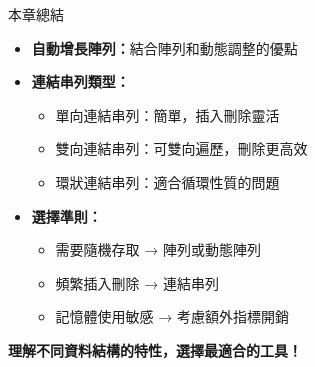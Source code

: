 \documentclass{beamer}
\begin{document}
\begin{frame}{本章總結}
\begin{itemize}
    \item \textbf{自動增長陣列：}結合陣列和動態調整的優點
    \item \textbf{連結串列類型：}
    \begin{itemize}
        \item 單向連結串列：簡單，插入刪除靈活
        \item 雙向連結串列：可雙向遍歷，刪除更高效
        \item 環狀連結串列：適合循環性質的問題
    \end{itemize}
    \item \textbf{選擇準則：}
    \begin{itemize}
        \item 需要隨機存取 → 陣列或動態陣列
        \item 頻繁插入刪除 → 連結串列
        \item 記憶體使用敏感 → 考慮額外指標開銷
    \end{itemize}
\end{itemize}

\vspace{1em}
\begin{center}
    \textbf{理解不同資料結構的特性，選擇最適合的工具！}
\end{center}
\end{frame}
\end{document}
